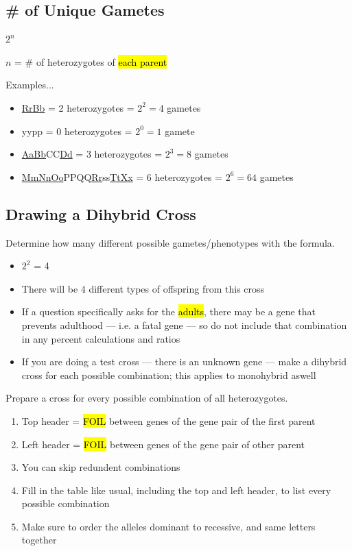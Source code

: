 \documentclass[a4paper,12pt]{article}
\begin{document}
\subsection{\# of Unique Gametes}\noindent

\begin{center}
\Huge $2^n$ \normalsize

$n$ = \# of heterozygotes of \hl{each parent}
\end{center}

Examples...
\begin{itemize}
    \item{\underline{RrBb} = 2 heterozygotes = $2^2 = 4$ gametes}
    \item{yypp = 0 heterozygotes = $2^0 = 1$ gamete}
    \item{\underline{AaBb}CC\underline{Dd} = 3 heterozygotes = $2^3 = 8$ gametes}
    \item{\underline{MmNnOo}PPQQ\underline{Rr}ss\underline{TtXx} = 6 heterozygotes = $2^6 = 64$ gametes}
\end{itemize}

\subsection{Drawing a Dihybrid Cross}
Determine how many different possible gametes/phenotypes with the formula.
\begin{itemize}
    \item{$2^2$ = 4}
    \item{There will be 4 different types of offspring from this cross}
    \item{If a question specifically asks for the \hl{adults}, there may be a gene that prevents adulthood --- i.e. a fatal gene --- so do not include that combination in any percent calculations and ratios}
    \item{If you are doing a test cross --- there is an unknown gene --- make a dihybrid cross for each possible combination; this applies to monohybrid aswell}
        \\
\end{itemize}

\pagebreak

Prepare a cross for every possible combination of all heterozygotes.
\begin{enumerate}
    \item{Top header = \hl{FOIL} between genes of the gene pair of the first parent}
    \item{Left header = \hl{FOIL} between genes of the gene pair of other parent}
    \item{You can skip redundent combinations}
    \item{Fill in the table like usual, including the top and left header, to list every possible combination}
    \item{Make sure to order the alleles dominant to recessive, and same letters together}
\end{enumerate}
\end{document}
